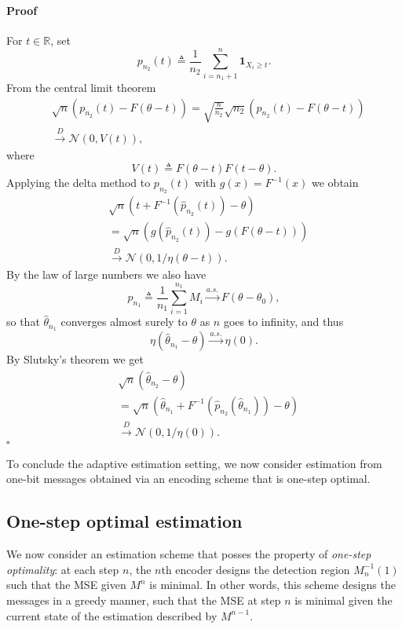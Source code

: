 \documentclass[letterpaper, 11pt]{IEEEtran}      %
\newenvironment{proof}{\paragraph*{Proof}}{\hfill$\square$ \newline}
\begin{document}
\begin{proof}
For $t\in \mathbb R$, set
\[
p_{n_2}(t) \triangleq \frac{1}{n_2} \sum_{i=n_1+1}^{n} \mathbf 1_{X_i \geq t}. 
\]
From the central limit theorem
\begin{align*}
& \sqrt{n} \left( p_{n_2}(t) - F( \theta - t) \right)  = \sqrt{\frac{n}{n_2}} \sqrt{n_2} \left(  p_{n_2}(t) - F(\theta - t) \right) \\
& \overset{D}{\rightarrow} \mathcal N\left( 0, V(t) \right),
\end{align*}
where
\[
V(t) \triangleq F(\theta - t) F \left( t - \theta\right). 
\]
Applying the delta method to $p_{n_2}(t)$ with $g(x) = F^{-1}(x)$ we obtain
\begin{align*}
& \sqrt{n} \left( t + F^{-1}(\hat{p}_{n_2}(t)) - \theta \right) \\
&= \sqrt{n} \left( g(\hat{p}_{n_2}(t)) - g \left(F(\theta-t) \right)  \right) \\
& \overset{D}{\to} \mathcal N\left(0, 
1/\eta(\theta-t) \right).
\end{align*}
By the law of large numbers we also have
\[
p_{n_1} \triangleq \frac{1}{n_1} \sum_{i=1}^{n_1} M_i \overset{a.s.}{\rightarrow} F(\theta - \theta_0),
\]
so that $\hat{\theta}_{n_1}$ converges almost surely to $\theta$ as $n$ goes to infinity, and thus 
\[
\eta( \hat{\theta}_{n_1}-\theta) \overset{a.s.}{\rightarrow} \eta(0). 
\]
By Slutsky's theorem we get
\begin{align*}
& \sqrt{n}\left(\hat{\theta}_{n_2} - \theta\right) \\
& = \sqrt{n} \left( \hat{\theta}_{n_1} + F^{-1}(\hat{p}_{n_2}(\hat{\theta}_{n_1})) - \theta \right)  \\
& \overset{D}{\to} \mathcal N\left( 0, 
1/\eta(0) \right). 
\end{align*}
\end{proof}
%

To conclude the adaptive estimation setting, we now consider estimation from one-bit messages obtained via an encoding scheme that is one-step optimal. %

\subsection{One-step optimal estimation}
We now consider an estimation scheme that posses the property of \emph{one-step optimality}: at each step $n$, the $n$th encoder designs the detection region $M_n^{-1}(1)$ such that the MSE given $M^n$ is minimal. In other words, this scheme designs the messages in a greedy manner, such that the MSE at step $n$ is minimal given the current state of the estimation described by $M^{n-1}$. \\
\end{document}
